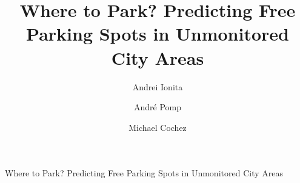 \documentclass{ws-ijait}
\begin{document}
{Where to Park? Predicting Free Parking Spots in Unmonitored City Areas}

%
\catchline{}{}{}{}{}
%

\title{Where to Park? Predicting Free Parking Spots in Unmonitored City Areas}


\author{Andrei Ionita}
\address{%
	Computer Science, RWTH Aachen University \\
	Aachen, Germany \\
	andrei.ionita@rwth-aachen.de
}


\author{André Pomp}
\address{%
	Institute of Information Management in Mechanical Engineering, RWTH Aachen \\
	Aachen, Germany \\
	andre.pomp@ima.rwth-aachen.de
}


\author{Michael Cochez}
\address{
	Fraunhofer FIT \\
	Aachen, Germany \\
	Computer Science 5, RWTH Aachen \\
	Aachen, Germany \\
	Faculty of Information Technology, University of Jyväskylä \\
	Jyväskylä, Finland \\
	michael.cochez@fit.fraunhofer.de
}
\end{document}

